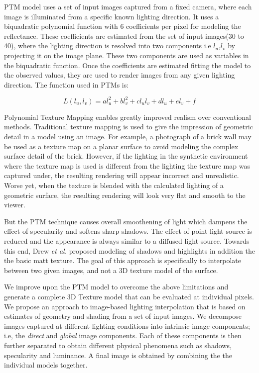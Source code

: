 PTM model uses a set of input images captured from a fixed camera, where each
image is illuminated from a specific known lighting direction. It uses a
biquadratic polynomial function with 6 coefficients per pixel for modeling the
reflectance. These coefficients are estimated from the set of input images(30 to
40), where the lighting direction is resolved into two components i.e
$l_{u}$,$l_{v}$ by projecting it on the image plane. These two components are
used as variables in the biquadratic function. Once the coefficients are
estimated fitting the model to the observed values, they are used to render
images from any given lighting direction.
The function used in PTMs is:

\begin{equation}
L(l_u,l_v) = al_u^2 + bl_v^2 + cl_ul_v + dl_u + el_v +f
\end{equation}

Polynomial Texture Mapping enables greatly improved realism
over conventional methods. Traditional texture mapping is used to
give the impression of geometric detail in a model using an image.
For example, a photograph of a brick wall may be used as a
texture map on a planar surface to avoid modeling the complex
surface detail of the brick. However, if the lighting in the
synthetic environment where the texture map is used is different
from the lighting the texture map was captured under, the
resulting rendering will appear incorrect and unrealistic. Worse
yet, when the texture is blended with the calculated lighting of a
geometric surface, the resulting rendering will look very flat and
smooth to the viewer.


But the PTM technique causes overall smoothening of light which dampens the effect
of specularity and softens sharp shadows. The effect of point light source is
reduced and the appearance is always similar to a diffused light source. Towards
this end, Drew {\em et al.} \cite{chap2-9} proposed modeling of shadows and
highlights in addition the the basic matt texture. The goal of this approach is
specifically to interpolate between two given images, and not a 3D texture model
of the surface.

We improve upon the PTM model to overcome the above limitations
and generate a complete 3D Texture model that can be evaluated at individual
pixels. We propose an approach to image-based lighting interpolation that is
based on estimates of geometry and shading from a set of input images. We
decompose images captured at different lighting conditions into intrinsic image
components; i.e, the {\em direct} and {\em global} image components. Each of
these components is then further separated to obtain different physical
phenomena such as shadows, specularity and luminance. A final image is obtained
by combining the the individual models together.

